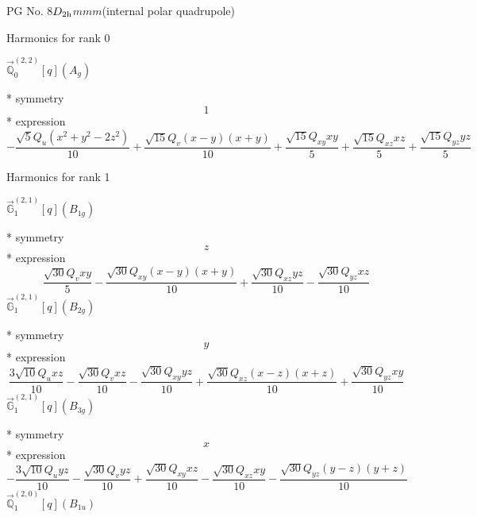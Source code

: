 \documentclass[fleqn,8pt]{jsarticle}
\begin{document}
\setcounter{MaxMatrixCols}{32}

\renewcommand{\tablename}{Table~}
\renewcommand{\figurename}{Figure~}
\begin{center}
\LARGE
PG No. 8\quad$D_{\rm 2h}$\quad$mmm$\quad[ orthorhombic ] (internal polar quadrupole)
\end{center}

\noindent * Harmonics for rank 0

\noindent\quad $\vec{\mathbb{Q}}_{0}^{(2,2)}[q](A_{g})$

\noindent\quad ** symmetry
\begin{dmath*}
1
\end{dmath*}
\noindent\quad ** expression
\begin{dmath*}
- \frac{\sqrt{5} Q_{u} \left(x^{2} + y^{2} - 2 z^{2}\right)}{10} + \frac{\sqrt{15} Q_{v} \left(x - y\right) \left(x + y\right)}{10} + \frac{\sqrt{15} Q_{xy} x y}{5} + \frac{\sqrt{15} Q_{xz} x z}{5} + \frac{\sqrt{15} Q_{yz} y z}{5}
\end{dmath*}

\noindent * Harmonics for rank 1

\noindent\quad $\vec{\mathbb{G}}_{1}^{(2,1)}[q](B_{1g})$

\noindent\quad ** symmetry
\begin{dmath*}
z
\end{dmath*}
\noindent\quad ** expression
\begin{dmath*}
\frac{\sqrt{30} Q_{v} x y}{5} - \frac{\sqrt{30} Q_{xy} \left(x - y\right) \left(x + y\right)}{10} + \frac{\sqrt{30} Q_{xz} y z}{10} - \frac{\sqrt{30} Q_{yz} x z}{10}
\end{dmath*}
\noindent\quad $\vec{\mathbb{G}}_{1}^{(2,1)}[q](B_{2g})$

\noindent\quad ** symmetry
\begin{dmath*}
y
\end{dmath*}
\noindent\quad ** expression
\begin{dmath*}
\frac{3 \sqrt{10} Q_{u} x z}{10} - \frac{\sqrt{30} Q_{v} x z}{10} - \frac{\sqrt{30} Q_{xy} y z}{10} + \frac{\sqrt{30} Q_{xz} \left(x - z\right) \left(x + z\right)}{10} + \frac{\sqrt{30} Q_{yz} x y}{10}
\end{dmath*}
\noindent\quad $\vec{\mathbb{G}}_{1}^{(2,1)}[q](B_{3g})$

\noindent\quad ** symmetry
\begin{dmath*}
x
\end{dmath*}
\noindent\quad ** expression
\begin{dmath*}
- \frac{3 \sqrt{10} Q_{u} y z}{10} - \frac{\sqrt{30} Q_{v} y z}{10} + \frac{\sqrt{30} Q_{xy} x z}{10} - \frac{\sqrt{30} Q_{xz} x y}{10} - \frac{\sqrt{30} Q_{yz} \left(y - z\right) \left(y + z\right)}{10}
\end{dmath*}
\noindent\quad $\vec{\mathbb{Q}}_{1}^{(2,0)}[q](B_{1u})$
\end{document}
